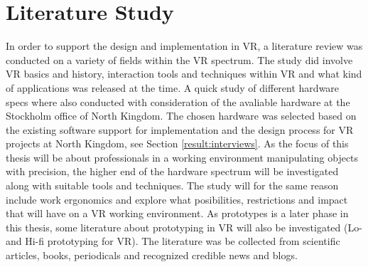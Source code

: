 \section{Literature Study}
In order to support the design and implementation in VR, a literature review was conducted on a variety of fields within the VR spectrum. The study did involve VR basics and history, interaction tools and techniques within VR and what kind of applications was released at the time. A quick study of different hardware specs where also conducted with consideration of the avaliable hardware at the Stockholm office of North Kingdom. The chosen hardware was selected based on the existing software support for implementation and the design process for VR projects at North Kingdom, see Section \ref{result:interviews}. As the focus of this thesis will be about professionals in a working environment manipulating objects with precision, the higher end of the hardware spectrum will be investigated along with suitable tools and techniques. The study will for the same reason include work ergonomics and explore what posibilities, restrictions and impact that will have on a VR working environment. As prototypes is a later phase in this thesis, some literature about prototyping in VR will also be investigated (Lo- and Hi-fi prototyping for VR). The literature was be collected from scientific articles, books, periodicals and recognized credible news and blogs.
